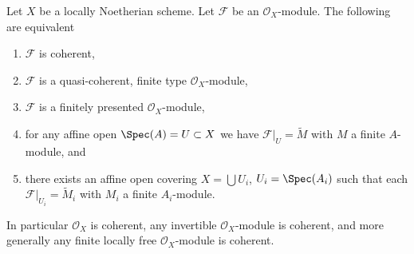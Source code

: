 \begin{lemma}
\label{lemma-coherent-Noetherian}
Let $X$ be a locally Noetherian scheme.
Let $\mathcal{F}$ be an $\mathcal{O}_X$-module.
The following are equivalent
\begin{enumerate}
\item $\mathcal{F}$ is coherent,
\item $\mathcal{F}$ is a quasi-coherent, finite type $\mathcal{O}_X$-module,
\item $\mathcal{F}$ is a finitely presented $\mathcal{O}_X$-module,
\item for any affine open $\Spec(A) = U \subset X$ we have
$\mathcal{F}|_U = \widetilde M$ with $M$ a finite $A$-module, and
\item there exists an affine open covering $X = \bigcup U_i$,
$U_i = \Spec(A_i)$ such that each
$\mathcal{F}|_{U_i} = \widetilde M_i$ with $M_i$ a finite $A_i$-module.
\end{enumerate}
In particular $\mathcal{O}_X$ is coherent, any invertible
$\mathcal{O}_X$-module is coherent, and more generally any
finite locally free $\mathcal{O}_X$-module is coherent.
\end{lemma}

